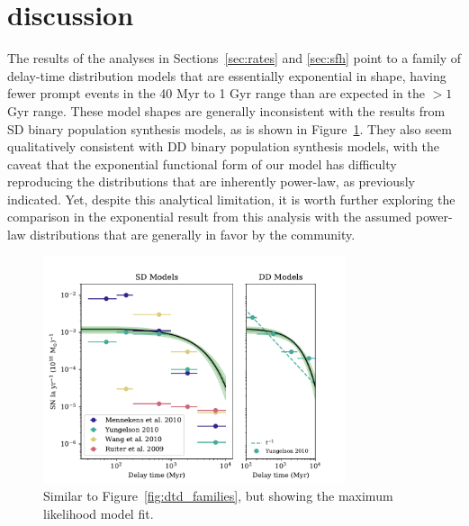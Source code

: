 \documentclass[apj, twocolumn]{aastex62}
\begin{document}
\section{discussion}\label{sec:discussion}
The results of the analyses in Sections~\ref{sec:rates} and \ref{sec:sfh} point to a family of delay-time distribution models that are essentially exponential in shape, having fewer prompt events in the 40 Myr to 1 Gyr range than are expected in the $>1$ Gyr range. These model shapes are generally inconsistent with the results from SD binary population synthesis models, as is shown in Figure~\ref{fig:dtd_eval}. They also seem qualitatively consistent with DD binary population synthesis models, with the caveat that the exponential functional form of our model has difficulty reproducing the distributions that are inherently power-law, as previously indicated. Yet, despite this analytical limitation, it is worth further exploring the comparison in the exponential result from this analysis with the assumed power-law distributions that are generally in favor by the community.
\begin{figure}[t]
   \centering
   \includegraphics[width=3.5in]{figure_pwr_law.pdf}
   \caption{\footnotesize Similar to Figure~\ref{fig:dtd_families}, but showing the maximum likelihood model fit.}
   \label{fig:dtd_eval}
\end{figure}
\end{document}
